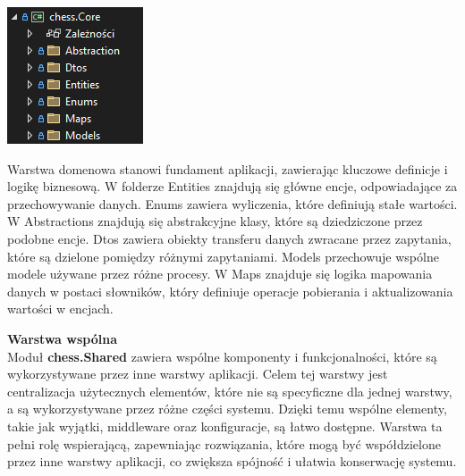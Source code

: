 \documentclass[12pt,a4paper]{article}
\begin{document}
\vspace{0.5cm}
\begin{minipage}[t]{0.45\textwidth}
    \vspace{0pt}
    \centering
    \includegraphics[width=\linewidth]{images/struktura_back_core.png} 
\end{minipage}
\hfill
\begin{minipage}[t]{0.45\textwidth}
    \vspace{0pt}
    \raggedright
    Warstwa domenowa stanowi fundament aplikacji, zawierając kluczowe definicje i logikę biznesową. W folderze Entities znajdują się główne encje, odpowiadające za przechowywanie danych. Enums zawiera wyliczenia, które definiują stałe wartości. W Abstractions znajdują się abstrakcyjne klasy, które są dziedziczone przez podobne encje. Dtos zawiera obiekty transferu danych zwracane przez zapytania, które są dzielone pomiędzy różnymi zapytaniami. Models przechowuje wspólne modele używane przez różne procesy. W Maps znajduje się logika mapowania danych w postaci słowników, który definiuje operacje pobierania i aktualizowania wartości w encjach.
\end{minipage}

\newpage

\noindent \textbf{Warstwa wspólna}\\
Moduł \textbf{chess.Shared} zawiera wspólne komponenty i funkcjonalności, które są wykorzystywane przez inne warstwy aplikacji. Celem tej warstwy jest centralizacja użytecznych elementów, które nie są specyficzne dla jednej warstwy, a są wykorzystywane przez różne części systemu. Dzięki temu wspólne elementy, takie jak wyjątki, middleware oraz konfiguracje, są łatwo dostępne. Warstwa ta pełni rolę wspierającą, zapewniając rozwiązania, które mogą być współdzielone przez inne warstwy aplikacji, co zwiększa spójność i ułatwia konserwację systemu.
\end{document}
